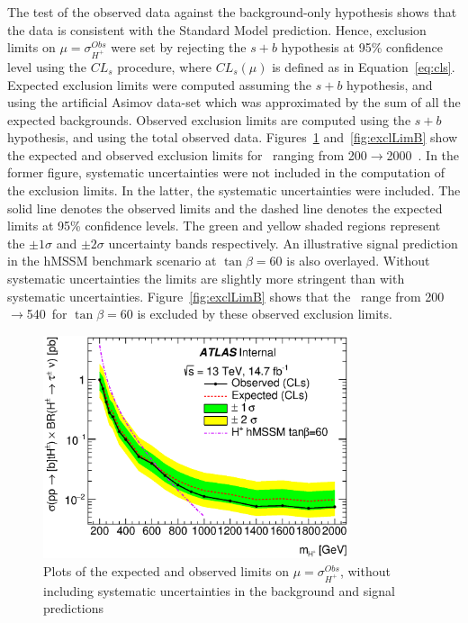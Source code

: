 \par The test of the observed data against the background-only hypothesis shows that the data 
is consistent with the Standard Model prediction. Hence, exclusion limits on  
$\mu=\sigma^{Obs}_{H^+}$ were set by rejecting the $s+b$ hypothesis at 95\% confidence 
level using the $CL_s$ procedure, where $CL_s(\mu)$ is defined as in Equation~\ref{eq:cls}.
Expected exclusion limits were computed assuming the $s+b$ hypothesis, and using the artificial 
Asimov data-set which was approximated by the sum of all the expected backgrounds. Observed 
exclusion limits are computed using the $s+b$ hypothesis, and using the total observed 
data. Figures~\ref{fig:exclLimA} and~\ref{fig:exclLimB} show the expected and observed exclusion limits for \mcH\ ranging 
from 200$\to$2000~\GeV. In the former figure, systematic uncertainties were not included in the computation 
of the exclusion limits. In the latter, the systematic uncertainties were included. 
The solid line denotes the observed limits and the dashed line denotes 
the expected limits at 95\% confidence levels. The green and yellow shaded regions represent the 
$\pm1\sigma$ and $\pm2\sigma$ uncertainty bands respectively. An illustrative signal prediction in 
the hMSSM benchmark scenario at $\tan\beta=60$ is also overlayed. Without systematic 
uncertainties the limits are slightly more stringent than with systematic uncertainties.	 
Figure~\ref{fig:exclLimB} shows that the \mcH\ range from 200$\to$540~\GeV for 
$\tan\beta=60$ is excluded by these observed exclusion limits. 

\begin{figure}[!h]
\centering
					 \includegraphics[width=0.8\textwidth]{figures/final_limits_no_sys_asym_limit_log.eps}
\caption{Plots of the expected and observed limits on $\mu=\sigma^{Obs}_{H^+}$, without including systematic uncertainties in the 
background and signal predictions}
\label{fig:exclLimA}
\end{figure}  

